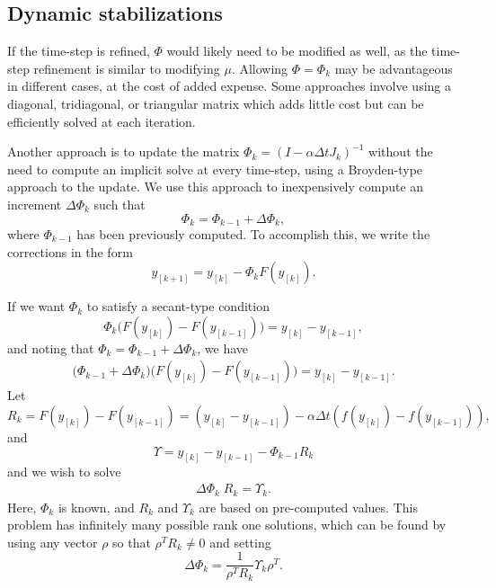 \documentclass{siamart251104}
\newcommand{\dt}{\Delta t}
\begin{document}
\subsection{Dynamic stabilizations}
If the time-step is refined, $\Phi$ would likely need
to be modified as well, as the time-step refinement is similar
to modifying $\mu$. Allowing $\Phi = \Phi_k$ may be advantageous in different cases,
at the cost of added expense. Some approaches involve using a diagonal,
tridiagonal, or triangular matrix which adds little cost but can be 
efficiently solved at each iteration.

Another approach is to update the matrix $\Phi_k =(I - \alpha \dt J_k)^{-1}$
without the  need to compute an implicit solve at every time-step,
using a Broyden-type approach \cite{broyden} to the update.
We use this approach to inexpensively compute an increment 
$\Delta \Phi_k$ such that
\[\Phi_{k}= \Phi_{k-1} + \Delta \Phi_k ,\]
where $\Phi_{k-1}$ has been previously computed.
To accomplish this, we  write the corrections in the  form
\[  y_{[k+1]}  = y_{[k]} -  \Phi_k  F(y_{[k]}) . \]

If we want $\Phi_k$ to satisfy a secant-type condition
\[ \Phi_k  \big(F(y_{[k]}) - F(y_{[k-1]}) \big) 
= y_{[k]} - y_{[k-1]},  \]
and noting that $\Phi_k = \Phi_{k-1} + \Delta \Phi_k$,
we have 
\begin{eqnarray*}
\big(\Phi_{k-1} + \Delta \Phi_k \big)
\big(F(y_{[k]}) - F(y_{[k-1]}) \big) 
= y_{[k]} - y_{[k-1]}.
\end{eqnarray*}  
Let 
\[ R_k = F(y_{[k]}) - F(y_{[k-1]}) =\left(y_{[k]} -y_{[k-1]} \right)  -
\alpha \dt \left( f(y_{[k]}) - f(y_{[k-1]}) \right) ,\]
and
\[ \Upsilon = y_{[k]} - y_{[k-1]} - \Phi_{k-1} R_k\]
and we  wish to solve
\begin{eqnarray}
    \Delta \Phi_k \; R_k = \Upsilon_k.
\end{eqnarray} 
Here, $\Phi_k$ is known, and $R_k$ and $\Upsilon_k$ are
based on pre-computed values.
This problem has infinitely many possible rank one solutions,
which can be found by using any vector $\rho$ so that 
$\rho^T R_k \ne 0$ and setting
\[ \Delta \Phi_k = \frac{1}{\rho^T R_k} \Upsilon_k \rho^T. \]
\end{document}
